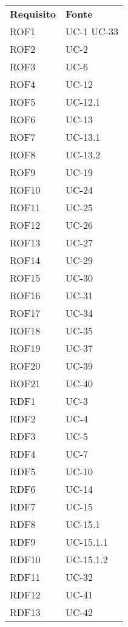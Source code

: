 \begin{longtable}{| p{5cm} | p{5cm} |}
		\rowcolor{LightBlue}
		\color{white}\bfseries Requisito & \color{white}\bfseries Fonte \\[0.25cm]
		\rowcolor{LightGray}
		ROF1 & UC-1 \newline UC-33\\
		ROF2 & UC-2\\
		\rowcolor{LightGray}
		ROF3 & UC-6\\
		ROF4 & UC-12\\
		\rowcolor{LightGray}
		ROF5 & UC-12.1\\
		ROF6 & UC-13\\
		\rowcolor{LightGray}
		ROF7 & UC-13.1\\
		ROF8 & UC-13.2\\
		\rowcolor{LightGray}
		ROF9 & UC-19\\
		ROF10 & UC-24\\
		\rowcolor{LightGray}
		ROF11 & UC-25\\
		ROF12 & UC-26\\
		\rowcolor{LightGray}
		ROF13 & UC-27\\
		ROF14 & UC-29\\
		\rowcolor{LightGray}
		ROF15 & UC-30\\
		ROF16 & UC-31\\
		\rowcolor{LightGray}
		ROF17 & UC-34\\
		ROF18 & UC-35\\
		\rowcolor{LightGray}
		ROF19 & UC-37\\
		ROF20 & UC-39\\
		\rowcolor{LightGray}
		ROF21 & UC-40\\
		RDF1 & UC-3\\
		\rowcolor{LightGray}
		RDF2 & UC-4\\
		RDF3 & UC-5\\
		\rowcolor{LightGray}
		RDF4 & UC-7\\
		RDF5 & UC-10\\
		\rowcolor{LightGray}
		RDF6 & UC-14\\
		RDF7 & UC-15\\
		\rowcolor{LightGray}
		RDF8 & UC-15.1\\
		RDF9 & UC-15.1.1\\
		\rowcolor{LightGray}
		RDF10 & UC-15.1.2\\
		RDF11 & UC-32\\
		\rowcolor{LightGray}
		RDF12 & UC-41\\
		RDF13 & UC-42\\

\end{longtable}

